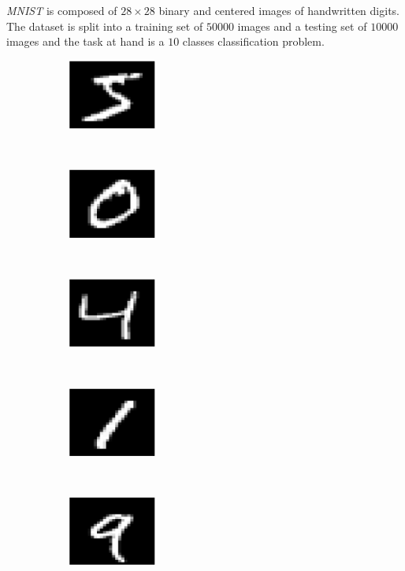 \documentclass[a4paper,11pt]{report}
\begin{document}
    \textit{MNIST} is composed of $28 \times 28$ binary and centered images of handwritten digits. The dataset is split into a training set of $50000$ images and a testing set of $10000$ images and the task at hand is a $10$ classes classification problem.\\
    
		\begin{figure}[h]
			\centering
			\begin{subfigure}[t]{0.17\textwidth}
				\centering
				\includegraphics[height=0.9in]{mnist_1.eps}
			\end{subfigure}%
			~ 
			\begin{subfigure}[t]{0.17\textwidth}
        \centering
        \includegraphics[height=0.9in]{mnist_2.eps}
			\end{subfigure}
			~ 
			\begin{subfigure}[t]{0.17\textwidth}
        \centering
        \includegraphics[height=0.9in]{mnist_3.eps}
			\end{subfigure}
			~ 
			\begin{subfigure}[t]{0.17\textwidth}
        \centering
        \includegraphics[height=0.9in]{mnist_4.eps}
			\end{subfigure}
			~ 
			\begin{subfigure}[t]{0.17\textwidth}
        \centering
        \includegraphics[height=0.9in]{mnist_5.eps}

\end{subfigure}
\end{figure}
\end{document}
